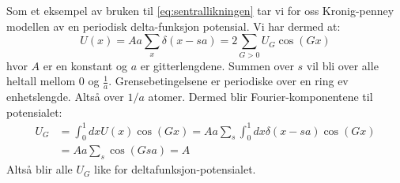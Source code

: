 \documentclass{article}
\begin{document}
\begin{tcolorbox}[breakable,boxrule=0pt]
  Som et eksempel av bruken til \ref{eq:sentrallikningen} tar vi for oss Kronig-penney modellen av en periodisk delta-funksjon potensial. Vi har dermed at:
  \begin{equation}
      U(x) = A a \sum_x \delta(x-sa) = 2 \sum_{G>0} U_G \cos(Gx)
  \end{equation}
  hvor $A$ er en konstant og $a$ er gitterlengdene. Summen over $s$ vil bli over alle heltall mellom $0$ og $\frac{1}{a}$. Grensebetingelsene er periodiske over en ring ev enhetslengde. Altså over $1 / a$ atomer. Dermed blir Fourier-komponentene til potensialet:
  \begin{align}
      U_G &= \int_0^1 dx U(x) \cos(Gx) = Aa\sum_s \int_0^1 dx \delta(x-sa) \cos(Gx) \\
      &= Aa \sum_s \cos(Gsa) = A
  \end{align}
  Altså blir alle $U_G$ like for deltafunksjon-potensialet.


\end{tcolorbox}
\end{document}
